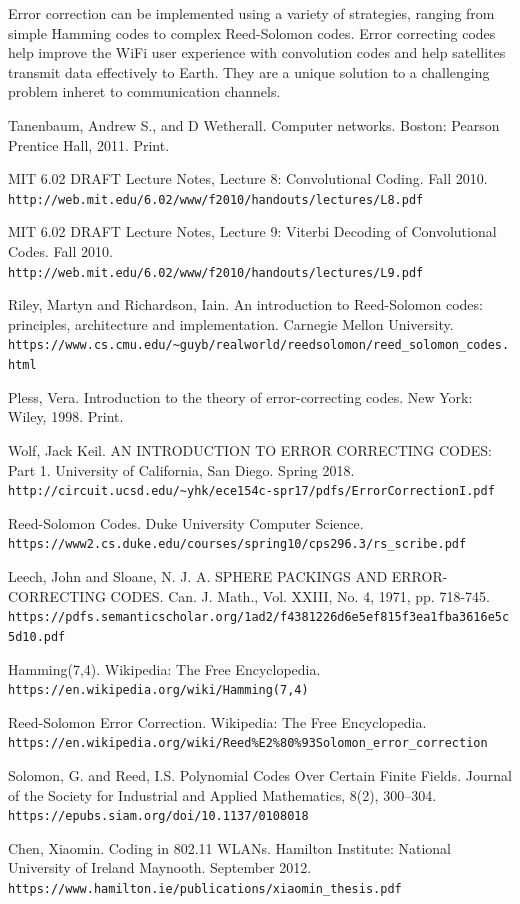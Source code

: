 \documentclass[12pt]{article}
\begin{document}
Error correction can be implemented using a variety of strategies, ranging from simple Hamming codes to complex Reed-Solomon codes. Error correcting codes help improve the WiFi user experience with convolution codes and help satellites transmit data effectively to Earth. They are a unique solution to a challenging problem inheret to communication channels.

\begin{thebibliography}{9}

Tanenbaum, Andrew S., and D Wetherall. Computer networks. Boston: Pearson Prentice Hall, 2011. Print.
 
MIT 6.02 DRAFT Lecture Notes, Lecture 8: Convolutional Coding. Fall 2010. 
\\\texttt{http://web.mit.edu/6.02/www/f2010/handouts/lectures/L8.pdf}

MIT 6.02 DRAFT Lecture Notes, Lecture 9: Viterbi Decoding of Convolutional Codes. Fall 2010.
\\\texttt{http://web.mit.edu/6.02/www/f2010/handouts/lectures/L9.pdf}

Riley, Martyn and Richardson, Iain. An introduction to Reed-Solomon codes: principles, architecture and implementation. Carnegie Mellon University.
\\\texttt{https://www.cs.cmu.edu/\textasciitilde{}guyb/realworld/reedsolomon/reed\_solomon\_codes.html}

Pless, Vera. Introduction to the theory of error-correcting codes. New York: Wiley, 1998. Print.

Wolf, Jack Keil. AN INTRODUCTION TO ERROR CORRECTING CODES: Part 1. University of California, San Diego. Spring 2018. \texttt{http://circuit.ucsd.edu/\textasciitilde{}yhk/ece154c-spr17/pdfs/ErrorCorrectionI.pdf}

Reed-Solomon Codes. Duke University Computer Science. \texttt{https://www2.cs.duke.edu/courses/spring10/cps296.3/rs\_scribe.pdf
}

Leech, John and Sloane, N. J. A. SPHERE PACKINGS AND ERROR-CORRECTING CODES. Can. J. Math., Vol. XXIII, No. 4, 1971, pp. 718-745. \texttt{https://pdfs.semanticscholar.org/1ad2/f4381226d6e5ef815f3ea1fba3616e5c5d10.pdf}

Hamming(7,4). Wikipedia: The Free Encyclopedia. \texttt{https://en.wikipedia.org/wiki/Hamming(7,4)}

Reed-Solomon Error Correction. Wikipedia: The Free Encyclopedia. \texttt{https://en.wikipedia.org/wiki/Reed\%E2\%80\%93Solomon\_error\_correction
}

Solomon, G. and Reed, I.S. Polynomial Codes Over Certain Finite Fields. Journal of the Society for Industrial and Applied Mathematics, 8(2), 300–304. \texttt{https://epubs.siam.org/doi/10.1137/0108018}

Chen, Xiaomin. Coding in 802.11 WLANs. Hamilton Institute: National University of Ireland Maynooth. September 2012. \texttt{https://www.hamilton.ie/publications/xiaomin\_thesis.pdf
}

\end{thebibliography}
\end{document}
